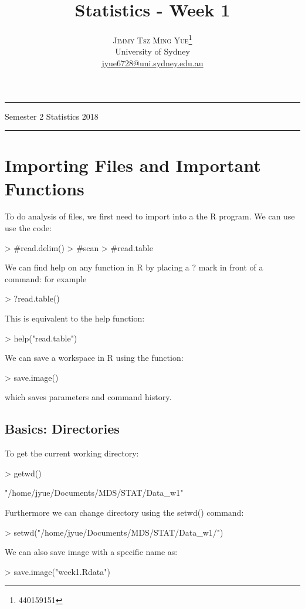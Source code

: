 \documentclass[twoside]{article}
\title{\vspace{-15mm}\fontsize{24pt}{10pt}\selectfont\textbf{Statistics - Week 1}} %
\author{
\large
\textsc{Jimmy Tsz Ming Yue}\thanks{440159151}\\[2mm] %
\normalsize University of Sydney \\ %
\normalsize \href{mailto:jyue6728@uni.sydney.edu.au}{jyue6728@uni.sydney.edu.au} %
\vspace{-5mm}
}
\date{}
\theoremstyle{definition}
\theoremstyle{definition}
\begin{document}


\maketitle %

\thispagestyle{fancy} %
\hrule \smallskip

\noindent Semester 2 \quad Statistics \hspace{10.5
cm} 2018
\smallskip
\hrule
\smallskip
\tableofcontents
\section{Importing Files and Important Functions}
To do analysis of files, we first need to import into a the R program. We can use use the code:
\begin{Schunk}
\begin{Sinput}
> #read.delim()
> #scan 
> #read.table
\end{Sinput}
\end{Schunk}
We can find help on any function in R by placing a ? mark in front of a command: for example 
\begin{Schunk}
\begin{Sinput}
> ?read.table()
\end{Sinput}
\end{Schunk}
This is equivalent to the help function:
\begin{Schunk}
\begin{Sinput}
> help("read.table")
\end{Sinput}
\end{Schunk}

We can save a workspace in R using the function:
\begin{Schunk}
\begin{Sinput}
> save.image()
\end{Sinput}
\end{Schunk}
which saves parameters and command history.

\subsection{Basics: Directories}
To get the current working directory:
\begin{Schunk}
\begin{Sinput}
> getwd()
\end{Sinput}
\begin{Soutput}
[1] "/home/jyue/Documents/MDS/STAT/Data_w1"
\end{Soutput}
\end{Schunk}
Furthermore we can change directory using the setwd() command:
\begin{Schunk}
\begin{Sinput}
> setwd("/home/jyue/Documents/MDS/STAT/Data_w1/")
\end{Sinput}
\end{Schunk}
We  can also save image with a specific name as:
\begin{Schunk}
\begin{Sinput}
> save.image("week1.Rdata")
\end{Sinput}
\end{Schunk}
\end{document}
